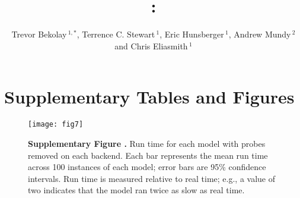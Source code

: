 \documentclass{frontiers_suppmat} %
\def\firstAuthorLast{Bekolay {et~al.}}
\def\Authors{Trevor Bekolay\,$^{1,*}$,
  Terrence C. Stewart\,$^{1}$,
  Eric Hunsberger\,$^1$,
  Andrew Mundy\,$^2$ and
  Chris Eliasmith\,$^1$}
\begin{document}
\onecolumn
{}

\title[Supplementary Material]{{}:\\ }
\author[\firstAuthorLast ]{\Authors}
\address{}
\correspondance{}
\extraAuth{}

\maketitle

\section{Supplementary Tables and Figures}

\begin{figure}[!ht]
\begin{center}
  \texttt{[image: fig7]}
\end{center}
\textbf{\label{fig:01} Supplementary Figure .}
       {Run time for each model with probes removed on each backend.
         Each bar represents the mean run time across 100 instances
         of each model;
         error bars are 95\% confidence intervals.
         Run time is measured relative to real time;
         e.g., a value of two indicates that the model ran twice as slow
         as real time.}
\end{figure}
\end{document}
